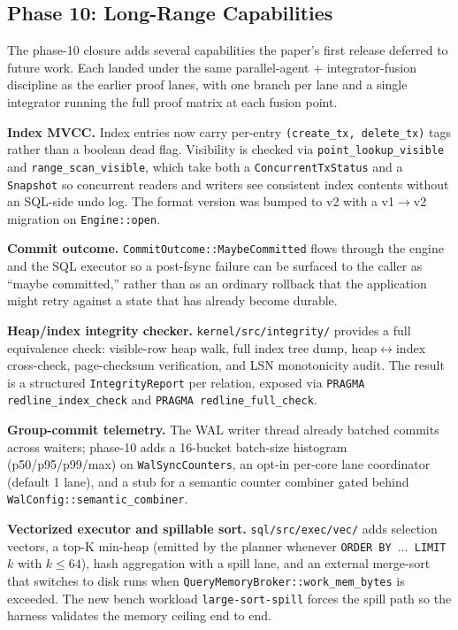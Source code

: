 \subsection{Phase 10: Long-Range Capabilities}
The phase-10 closure adds several capabilities the paper's first
release deferred to future work. Each landed under the same
parallel-agent + integrator-fusion discipline as the earlier
proof lanes, with one branch per lane and a single integrator running
the full proof matrix at each fusion point.

\textbf{Index MVCC.} Index entries now carry per-entry
\texttt{(create\_tx, delete\_tx)} tags rather than a boolean dead flag.
Visibility is checked via \texttt{point\_lookup\_visible} and
\texttt{range\_scan\_visible}, which take both a
\texttt{ConcurrentTxStatus} and a \texttt{Snapshot} so concurrent
readers and writers see consistent index contents without an
SQL-side undo log. The format version was bumped to v2 with a
v1$\rightarrow$v2 migration on \texttt{Engine::open}.

\textbf{Commit outcome.} \texttt{CommitOutcome::MaybeCommitted} flows
through the engine and the SQL executor so a post-fsync failure can
be surfaced to the caller as ``maybe committed,'' rather than as an
ordinary rollback that the application might retry against a state
that has already become durable.

\textbf{Heap/index integrity checker.}
\texttt{kernel/src/integrity/} provides a full equivalence check:
visible-row heap walk, full index tree dump, heap$\leftrightarrow$index
cross-check, page-checksum verification, and LSN monotonicity audit.
The result is a structured \texttt{IntegrityReport} per relation,
exposed via \texttt{PRAGMA redline\_index\_check} and
\texttt{PRAGMA redline\_full\_check}.

\textbf{Group-commit telemetry.} The WAL writer thread already
batched commits across waiters; phase-10 adds a 16-bucket batch-size
histogram (p50/p95/p99/max) on \texttt{WalSyncCounters}, an opt-in
per-core lane coordinator (default 1 lane), and a stub for a semantic
counter combiner gated behind \texttt{WalConfig::semantic\_combiner}.

\textbf{Vectorized executor and spillable sort.}
\texttt{sql/src/exec/vec/} adds selection vectors, a top-K min-heap
(emitted by the planner whenever \texttt{ORDER BY $\dots$ LIMIT $k$}
with $k\le 64$), hash aggregation with a spill lane, and an external
merge-sort that switches to disk runs when
\texttt{QueryMemoryBroker::work\_mem\_bytes} is exceeded. The new
bench workload \texttt{large-sort-spill} forces the spill path so
the harness validates the memory ceiling end to end.

